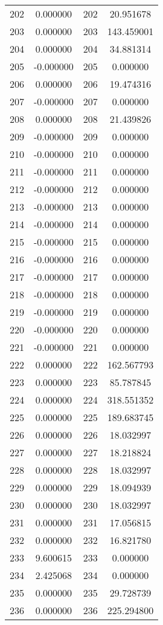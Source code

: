 \documentclass[12pt]{article}
\begin{document}
\begin{longtable}{@{}cccc@{}}
202 & 0.000000 & 202 & 20.951678 \\
203 & 0.000000 & 203 & 143.459001 \\
204 & 0.000000 & 204 & 34.881314 \\
205 & -0.000000 & 205 & 0.000000 \\
206 & 0.000000 & 206 & 19.474316 \\
207 & -0.000000 & 207 & 0.000000 \\
208 & 0.000000 & 208 & 21.439826 \\
209 & -0.000000 & 209 & 0.000000 \\
210 & -0.000000 & 210 & 0.000000 \\
211 & -0.000000 & 211 & 0.000000 \\
212 & -0.000000 & 212 & 0.000000 \\
213 & -0.000000 & 213 & 0.000000 \\
214 & -0.000000 & 214 & 0.000000 \\
215 & -0.000000 & 215 & 0.000000 \\
216 & -0.000000 & 216 & 0.000000 \\
217 & -0.000000 & 217 & 0.000000 \\
218 & -0.000000 & 218 & 0.000000 \\
219 & -0.000000 & 219 & 0.000000 \\
220 & -0.000000 & 220 & 0.000000 \\
221 & -0.000000 & 221 & 0.000000 \\
222 & 0.000000 & 222 & 162.567793 \\
223 & 0.000000 & 223 & 85.787845 \\
224 & 0.000000 & 224 & 318.551352 \\
225 & 0.000000 & 225 & 189.683745 \\
226 & 0.000000 & 226 & 18.032997 \\
227 & 0.000000 & 227 & 18.218824 \\
228 & 0.000000 & 228 & 18.032997 \\
229 & 0.000000 & 229 & 18.094939 \\
230 & 0.000000 & 230 & 18.032997 \\
231 & 0.000000 & 231 & 17.056815 \\
232 & 0.000000 & 232 & 16.821780 \\
233 & 9.600615 & 233 & 0.000000 \\
234 & 2.425068 & 234 & 0.000000 \\
235 & 0.000000 & 235 & 29.728739 \\
236 & 0.000000 & 236 & 225.294800 \\

\end{longtable}
\end{document}

